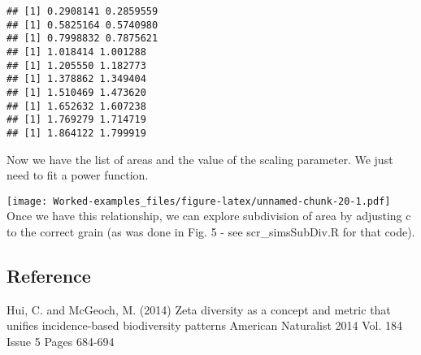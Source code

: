 \documentclass[
]{article}
\newenvironment{Shaded}{\begin{snugshade}}{\end{snugshade}}
\newcommand{\AttributeTok}[1]{\textcolor[rgb]{0.77,0.63,0.00}{#1}}
\newcommand{\CommentTok}[1]{\textcolor[rgb]{0.56,0.35,0.01}{\textit{#1}}}
\newcommand{\DecValTok}[1]{\textcolor[rgb]{0.00,0.00,0.81}{#1}}
\newcommand{\FloatTok}[1]{\textcolor[rgb]{0.00,0.00,0.81}{#1}}
\newcommand{\FunctionTok}[1]{\textcolor[rgb]{0.00,0.00,0.00}{#1}}
\newcommand{\NormalTok}[1]{#1}
\newcommand{\OtherTok}[1]{\textcolor[rgb]{0.56,0.35,0.01}{#1}}
\newcommand{\SpecialCharTok}[1]{\textcolor[rgb]{0.00,0.00,0.00}{#1}}
\begin{document}
\begin{verbatim}
## [1] 0.2908141 0.2859559
## [1] 0.5825164 0.5740980
## [1] 0.7998832 0.7875621
## [1] 1.018414 1.001288
## [1] 1.205550 1.182773
## [1] 1.378862 1.349404
## [1] 1.510469 1.473620
## [1] 1.652632 1.607238
## [1] 1.769279 1.714719
## [1] 1.864122 1.799919
\end{verbatim}

Now we have the list of areas and the value of the scaling parameter. We
just need to fit a power function.

\begin{Shaded}
\end{Shaded}

\texttt{[image: Worked-examples\_files/figure-latex/unnamed-chunk-20-1.pdf]}
Once we have this relationship, we can explore subdivision of area by
adjusting c to the correct grain (as was done in Fig. 5 - see
scr\_simsSubDiv.R for that code).

\hypertarget{reference}{%
\subsection{Reference}\label{reference}}

Hui, C. and McGeoch, M. (2014) Zeta diversity as a concept and metric
that unifies incidence-based biodiversity patterns American Naturalist
2014 Vol. 184 Issue 5 Pages 684-694
\end{document}
